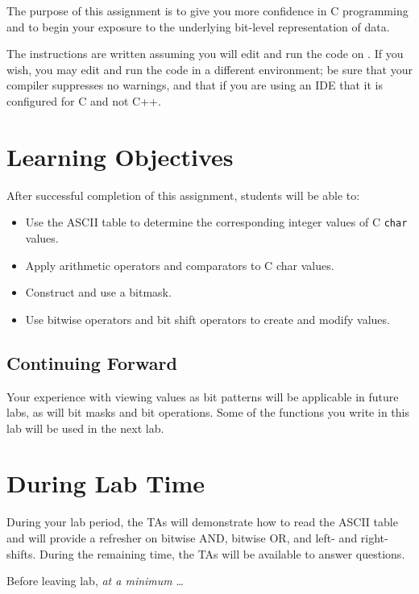 The purpose of this assignment is to give you more confidence in C programming and to begin your exposure to the underlying bit-level representation of data.

The instructions are written assuming you will edit and run the code on \runtimeenvironment.
If you wish, you may edit and run the code in a different environment;
be sure that your compiler suppresses no warnings, and that if you are using an IDE that it is configured for C and not C++.

\section*{Learning Objectives}

After successful completion of this assignment, students will be able to:
\begin{itemize}
    \item Use the ASCII table to determine the corresponding integer values of C \lstinline{char} values.
    \item Apply arithmetic operators and comparators to C \lstinline{}{char} values.
    \item Construct and use a bitmask.
    \item Use bitwise operators and bit shift operators to create and modify values.
\end{itemize}

\subsection*{Continuing Forward}

Your experience with viewing values as bit patterns will be applicable in future labs, as will bit masks and bit operations.
Some of the functions you write in this lab will be used in the next lab.

\section*{During Lab Time}

During your lab period, the TAs will demonstrate how to read the ASCII table and will provide a refresher on bitwise AND, bitwise OR, and left- and right-shifts.
During the remaining time, the TAs will be available to answer questions.

Before leaving lab, \textit{at a minimum} \dots
